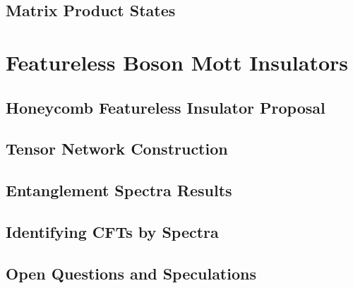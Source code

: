 \documentclass[t]{beamer}
\begin{document}
\subsection{Matrix Product States}








%

\section{Featureless Boson Mott Insulators}
\subsection{Honeycomb Featureless Insulator Proposal}


\subsection{Tensor Network Construction}

\subsection{Entanglement Spectra Results}


\subsection{Identifying CFTs by Spectra}


\subsection{Open Questions and Speculations}
%
\section*{}

%
\end{document}
